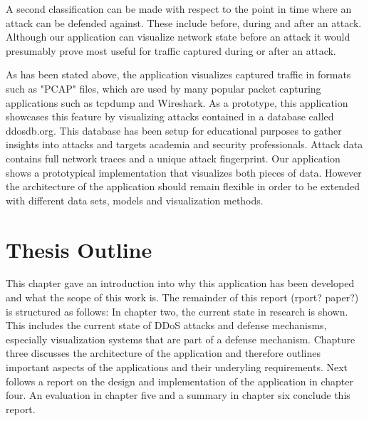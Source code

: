 A second classification can be made with respect to the point in time where an attack can be defended against. These include before, during and after an attack.
Although our application can visualize network state before an attack it would presumably prove most useful for traffic captured during or after an attack\cite{zargar}.

As has been stated above, the application visualizes captured traffic in formats such as "PCAP" files, which are used by many popular packet capturing applications such as tcpdump and Wireshark. As a prototype, this application showcases this feature by visualizing attacks contained in a database called ddosdb.org. This database has been setup for educational purposes to gather insights into attacks and targets academia and security professionals. Attack data contains full network traces and a unique attack fingerprint\cite{ddosdb}. Our application shows a prototypical implementation that visualizes both pieces of data. However the architecture of the application should remain flexible in order to be extended with different data sets, models and visualization methods.

\section{Thesis Outline}

This chapter gave an introduction into why this application has been developed and what the scope of this work is. The remainder of this report (rport? paper?) is structured as follows: In chapter two, the current state in research is shown. This includes the current state of DDoS attacks and defense mechanisms, especially visualization systems that are part of a defense mechanism. Chapture three discusses the architecture of the application and therefore outlines important aspects of the applications and their underyling requirements. Next follows a report on the design and implementation of the application in chapter four. An evaluation in chapter five and a summary in chapter six conclude this report.